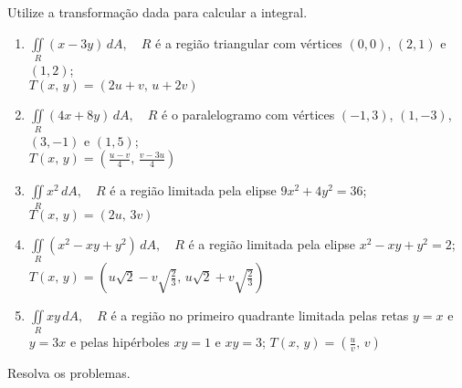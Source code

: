 



	
	
	\vspace{5mm}
	
	Utilize a transformação dada para calcular a integral.
	
	\begin{enumerate}
		
		\item $\displaystyle \iint \limits_R (x - 3y) \, dA, \quad R$ é a região triangular com vértices $(0,0)$, $(2,1)$ e $(1,2)$; \\ $T(x,\, y) = (2u + v,\, u + 2v)$
		
		\item $\displaystyle \iint \limits_R (4x + 8y) \, dA, \quad R$ é o paralelogramo com vértices $(-1,3)$, $(1,-3)$, $(3,-1)$ e $(1,5)$; \\ $T(x,\, y) = (\frac{u-v}{4},\, \frac{v-3u}{4})$
		
		\item $\displaystyle \iint \limits_R x^2 \, dA, \quad R$ é a região limitada pela elipse $9x^2 + 4y^2 = 36$; \\ $T(x,\, y) = (2u,\, 3v)$
		\resposta{$6\pi$}
		
		\item $\displaystyle \iint \limits_R (x^2 - xy + y^2) \, dA, \quad R$ é a região limitada pela elipse $x^2 - xy + y^2 = 2$; \\ $T(x,\, y) = (u\sqrt{2} - v\sqrt{\frac{2}{3}},\, u\sqrt{2} + v\sqrt{\frac{2}{3}})$
		
		\item $\displaystyle \iint \limits_R xy \, dA, \quad R$ é a região no primeiro quadrante limitada pelas retas $y = x$ e $y = 3x$ e pelas hipérboles $xy = 1$ e $xy = 3$; \quad $T(x,\, y) = (\frac{u}{v},\, v)$
	
	\end{enumerate}
	
	\vspace{5mm}
	
	Resolva os problemas.
	
